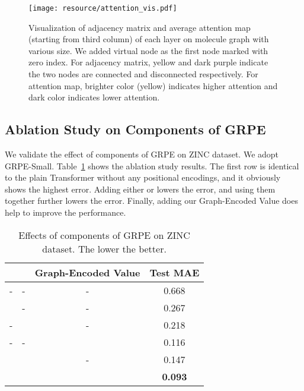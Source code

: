 \documentclass[letterpaper]{article} \usepackage{aaai23}  \usepackage{times}  \usepackage{helvet}  \usepackage{courier}  \usepackage[hyphens]{url}  \usepackage{graphicx} \urlstyle{rm} \def\UrlFont{\rm}  \usepackage{natbib}  \usepackage{caption} \frenchspacing  \setlength{\pdfpagewidth}{8.5in} \setlength{\pdfpageheight}{11in} \usepackage{algorithm}
\begin{document}
\begin{figure*}
\centering
\hspace*{-3cm}\texttt{[image: resource/attention\_vis.pdf]}
\vspace{-1.3cm}
\caption{Visualization of adjacency matrix and average attention map (starting from third column) of each layer on molecule graph with various size. We added virtual node as the first node marked with zero index. For adjacency matrix, yellow and dark purple indicate the two nodes are connected and disconnected respectively. For attention map, brighter color (yellow) indicates higher attention and dark color indicates lower attention.}
\label{fig:viz_att}
\end{figure*}


\subsection{Ablation Study on Components of GRPE}
\label{sec:gsa_effect}

We validate the effect of components of GRPE on ZINC dataset.
We adopt GRPE-Small.
Table~\ref{tab:zinc_comp_ablation} shows the ablation study results.
The first row is identical to the plain Transformer without any positional encodings, and it obviously shows the highest error.
Adding either  or  lowers the error, and using them together further lowers the error.
Finally, adding our Graph-Encoded Value does help to improve the performance.


\begin{table}
\centering
\caption {Effects of components of GRPE on ZINC dataset. The lower the better.} 
\label{tab:zinc_comp_ablation}
\vspace{-0.2cm}
\begin{tabular}{cccc}
\toprule                   


 &  & Graph-Encoded Value & Test MAE \\
\hline

- & - & - & 0.668 \\
 & - & - & 0.267\\
- &  & - & 0.218 \\
- & - &  & 0.116 \\
 &  & - & 0.147 \\
 &  &  & \textbf{0.093} \\


\bottomrule
\end{tabular}
\end{table}
\end{document}
